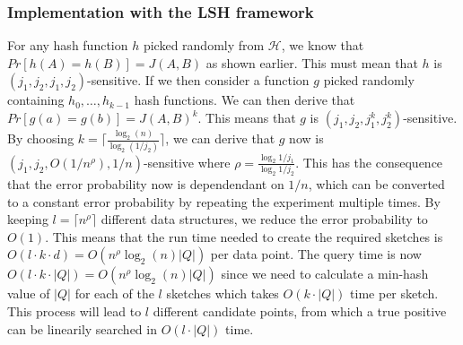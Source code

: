 \subsubsection{Implementation with the LSH framework}
For any hash function $h$ picked randomly from $\mathcal{H}$, we know that $Pr[h(A)=h(B)]=J(A,B)$ as shown earlier. This must mean that $h$ is $(j_1, j_2, j_1, j_2)$-sensitive. If we then consider a function $g$ picked randomly containing $h_0, \dots, h_{k-1}$ hash functions. We can then derive that $Pr[g(a)=g(b)]=J(A,B)^k$. This means that $g$ is $(j_1, j_2, j_1^k, j_2^k)$-sensitive. By choosing $k=\lceil \frac{\log_2(n)}{\log_2(1/j_2)} \rceil$, we can derive that $g$ now is $(j_1, j_2, O(1/n^\rho), 1/n)$-sensitive where $\rho=\frac{\log_2{1/j_1}}{\log_2{1/j_2}}$. %
This has the consequence that the error probability now is dependendant on $1/n$, which can be converted to a constant error probability by repeating the experiment multiple times. By keeping $l=\lceil n^\rho \rceil$ different data structures, we reduce the error probability to $O(1)$.
This means that the run time needed to create the required sketches is $O(l\cdot k \cdot d)=O(n^\rho \log_2(n)|Q|)$ per data point. The query time is now $O(l\cdot k \cdot |Q|)=O(n^\rho \log_2(n)|Q|)$ since we need to calculate a min-hash value of $|Q|$ for each of the $l$ sketches which takes $O(k\cdot |Q|)$ time per sketch. This process will lead to $l$ different candidate points, from which a true positive can be linearily searched in $O(l\cdot |Q|)$ time.
